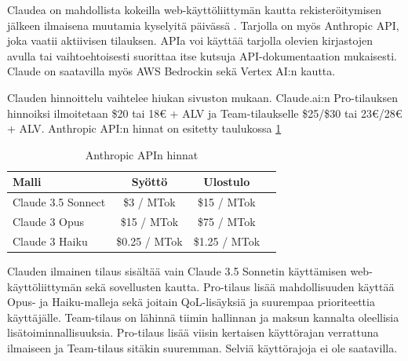 Claudea on mahdollista kokeilla web-käyttöliittymän kautta rekisteröitymisen
jälkeen ilmaisena muutamia kyselyitä päivässä \parencite{claudeChat}. Tarjolla
on myös Anthropic API, joka vaatii aktiivisen tilauksen. APIa voi käyttää
tarjolla olevien kirjastojen avulla tai vaihtoehtoisesti suorittaa itse kutsuja
API-dokumentaation mukaisesti. Claude on saatavilla myös AWS Bedrockin sekä
Vertex AI:n kautta. \parencite{anthropicAPIDocs}

Clauden hinnoittelu vaihtelee hiukan sivuston mukaan. Claude.ai:n Pro-tilauksen
hinnoiksi ilmoitetaan \$20 tai 18€ + ALV ja Team-tilaukselle \$25/\$30 tai
23€/28€ + ALV. \parencite{anthropicPricing} \parencite{claudePricing} Anthropic
API:n hinnat on esitetty taulukossa \ref{tab:anthropic-api-pricing}

\begin{table}[H]
  \centering
  \caption{Anthropic APIn hinnat}
  \label{tab:anthropic-api-pricing}
  \begin{tabular}{lccc}
    \textbf{Malli} & \textbf{Syöttö} & \textbf{Ulostulo} \\
    \hline
    Claude 3.5 Sonnect &    \$3 / MTok &   \$15 / MTok \\
    Claude 3 Opus      &   \$15 / MTok &   \$75 / MTok \\
    Claude 3 Haiku     & \$0.25 / MTok & \$1.25 / MTok \\
    \hline
  \end{tabular}
\end{table}

Clauden ilmainen tilaus sisältää vain Claude 3.5 Sonnetin käyttämisen web-
käyttöliittymän sekä sovellusten kautta. Pro-tilaus lisää mahdollisuuden
käyttää Opus- ja Haiku-malleja sekä joitain QoL-lisäyksiä ja suurempaa
prioriteettia käyttäjälle. Team-tilaus on lähinnä tiimin hallinnan ja maksun
kannalta oleellisia lisätoiminnallisuuksia. Pro-tilaus lisää viisin kertaisen
käyttörajan verrattuna ilmaiseen ja Team-tilaus sitäkin suuremman.
\parencite{anthropicPricing} \parencite{claudePricing} Selviä käyttörajoja ei
ole saatavilla.
